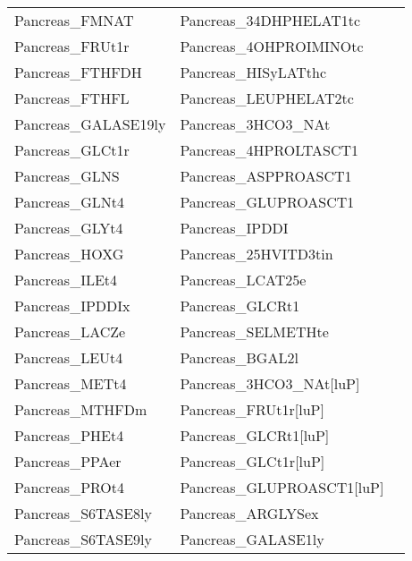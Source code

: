 \begin{table}[h]
\begin{center}
\begin{tabular*}{\textwidth}{l @{\extracolsep{\fill}} ll}
Pancreas\_FMNAT       & Pancreas\_34DHPHELAT1tc \\   	
Pancreas\_FRUt1r      & Pancreas\_4OHPROIMINOtc \\   	
Pancreas\_FTHFDH      & Pancreas\_HISyLATthc \\   	
Pancreas\_FTHFL       & Pancreas\_LEUPHELAT2tc  \\   	
Pancreas\_GALASE19ly  & Pancreas\_3HCO3\_NAt \\   	
Pancreas\_GLCt1r      & Pancreas\_4HPROLTASCT1  \\   	
Pancreas\_GLNS        & Pancreas\_ASPPROASCT1\\   	
Pancreas\_GLNt4       & Pancreas\_GLUPROASCT1 \\   	
Pancreas\_GLYt4       & Pancreas\_IPDDI \\   	
Pancreas\_HOXG        & Pancreas\_25HVITD3tin \\   	
Pancreas\_ILEt4       & Pancreas\_LCAT25e \\   	
Pancreas\_IPDDIx      & Pancreas\_GLCRt1 \\   	
Pancreas\_LACZe       & Pancreas\_SELMETHte \\   	
Pancreas\_LEUt4       & Pancreas\_BGAL2l \\   	
Pancreas\_METt4       & Pancreas\_3HCO3\_NAt[luP] \\   	
Pancreas\_MTHFDm      & Pancreas\_FRUt1r[luP] \\   	
Pancreas\_PHEt4       & Pancreas\_GLCRt1[luP] \\   	
Pancreas\_PPAer       & Pancreas\_GLCt1r[luP] \\   	
Pancreas\_PROt4       & Pancreas\_GLUPROASCT1[luP] \\   	
Pancreas\_S6TASE8ly   & Pancreas\_ARGLYSex \\   	
Pancreas\_S6TASE9ly   & Pancreas\_GALASE1ly \\   	

	\hline
	\end{tabular*}
\end{center}
\label{GIM:tbls2}%
\end{table}

\clearpage

